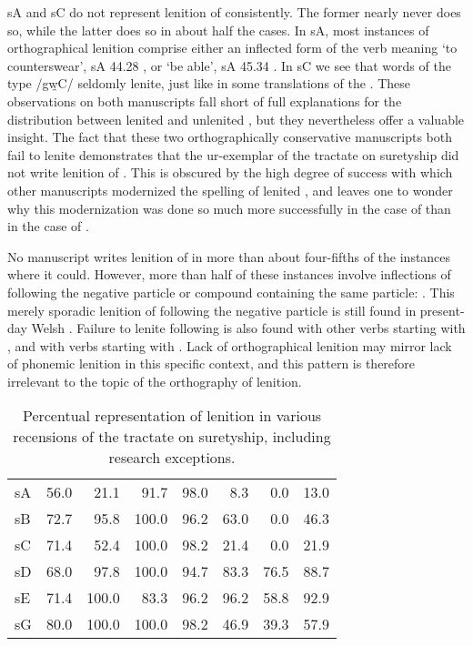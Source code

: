 \Gls{sA} and \gls{sC} do not represent lenition of  consistently. The former nearly never does so, while the latter does so in about half the cases. In \gls{sA}, most instances of orthographical lenition comprise either an inflected form of the verb meaning `to counterswear', \eg \gls{sA} 44.28 , or `be able', \eg \gls{sA} 45.34 . In \gls{sC} we see that words of the type /gw̯\gls{C}/ seldomly lenite, just like in some translations of the  . These observations on both manuscripts fall short of full explanations for the distribution between lenited and unlenited , but they nevertheless offer a valuable insight. The fact that these two orthographically conservative manuscripts both fail to lenite  demonstrates that the ur-exemplar of the tractate on suretyship did not write lenition of . This is obscured by the high degree of success with which other manuscripts modernized the spelling of lenited , and leaves one to wonder why this modernization was done so much more successfully in the case of  than in the case of .

No manuscript writes lenition of  in more than about four-fifths of the instances where it could. However, more than half of these instances involve inflections of  following the negative particle  or compound containing the same particle: . This merely sporadic lenition of  following the negative particle is still found in present-day Welsh \autocite[695]{thomas_gramadeg_1996}. Failure to lenite following  is also found with other verbs starting with , and with verbs starting with . Lack of orthographical lenition may mirror lack of phonemic lenition in this specific context, and this pattern is therefore irrelevant to the topic of the orthography of lenition. 


\begin{table}[h]
  \centering
    \begin{tabular}{lddddddd}
    \toprule
     &  &  &  &  &  &  &  \\
    \midrule
    \gls{sA} & 56.0 & 21.1 & 91.7 & 98.0 & 8.3 & 0.0 & 13.0 \\
    \gls{sB} & 72.7 & 95.8 & 100.0 & 96.2 & 63.0 & 0.0 & 46.3 \\
    \gls{sC} & 71.4 & 52.4 & 100.0 & 98.2 & 21.4 & 0.0 & 21.9 \\
    \gls{sD} & 68.0 & 97.8 & 100.0 & 94.7 & 83.3 & 76.5 & 88.7 \\
    \gls{sE} & 71.4 & 100.0 & 83.3 & 96.2 & 96.2 & 58.8 & 92.9 \\
    \gls{sG} & 80.0 & 100.0 & 100.0 & 98.2 & 46.9 & 39.3 & 57.9 \\
    \bottomrule
    \end{tabular}%
    \caption{Percentual representation of lenition in various recensions of the tractate on suretyship, including research exceptions.}
    \label{tab:lenlawcountryincre}%
\end{table}%



